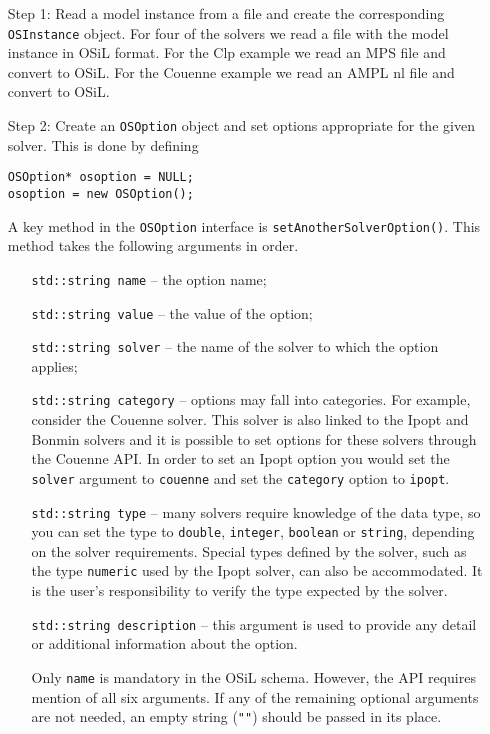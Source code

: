 \begin{itemize}
\item[Step 1:]  Read a model instance from a file  and create the corresponding {\tt OSInstance} object.
For four of the solvers we read a file with the model instance in OSiL format. For the Clp example 
we read an MPS file and convert to OSiL. For the Couenne example we read an AMPL nl file and convert 
to OSiL.

\item[Step 2:]  Create an {\tt OSOption} object and set options appropriate for the given solver.   
This is done by defining

\begin{verbatim}
OSOption* osoption = NULL;
osoption = new OSOption();
\end{verbatim}

A key method in the {\tt OSOption} interface is {\tt setAnotherSolverOption()}.  This method 
takes the following arguments in order.

\begin{itemize}
\item[] {\tt std::string name} -- the option name;
\item[] {\tt std::string value}  -- the value of the option;
\item[] {\tt std::string solver} -- the name of the solver to which the option applies;
\item[] {\tt std::string category} -- options may fall into categories. For example, consider the  
Couenne solver.  This solver is also linked to the Ipopt and Bonmin solvers and  it is possible 
to set options for these solvers through the Couenne API. In order to set an Ipopt option 
you would set the {\tt solver} argument to {\tt couenne} and set the {\tt category} option 
to {\tt ipopt}.

\item[] {\tt std::string type} -- many solvers require knowledge of the data type, so you can set 
the type to {\tt double}, {\tt integer}, {\tt boolean} or {\tt string}, depending on the solver 
requirements. Special types defined by the solver, such as the type {\tt numeric} used by the
Ipopt solver, can also be accommodated. It is the user's responsibility to verify the type
expected by the solver.


\item[] {\tt std::string  description} -- this argument is used to provide any detail or 
additional information about the option.

\item[] Only {\tt name} is mandatory in the OSiL schema. 
However, the API requires mention of all six arguments. 
If any of the remaining optional arguments are not needed, 
an empty string ({\tt""}) should be passed in its place.


\end{itemize}
\end{itemize}
